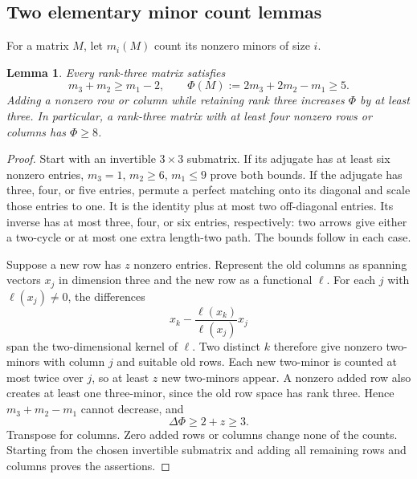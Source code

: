 \documentclass[11pt,a4paper]{article}
\newtheorem{lemma}[theorem]{Lemma}
\theoremstyle{remark}\newtheorem{remark}[theorem]{Remark}
\begin{document}
\subsection{Two elementary minor count lemmas}
For a matrix $M$, let $m_i(M)$ count its nonzero minors of size $i$.

\begin{lemma}\label{mrn:e:r8:lem:minor}
Every rank-three matrix satisfies
\[
 m_3+m_2\ge m_1-2,\qquad
 \Phi(M):=2m_3+2m_2-m_1\ge5.
\]
Adding a nonzero row or column while retaining rank three increases $\Phi$ by at least three. In particular, a rank-three matrix with at least four nonzero rows or columns has $\Phi\ge8$.
\end{lemma}
\begin{proof}
Start with an invertible $3\times3$ submatrix. If its adjugate has at least six nonzero entries, $m_3=1$, $m_2\ge6$, $m_1\le9$ prove both bounds. If the adjugate has three, four, or five entries, permute a perfect matching onto its diagonal and scale those entries to one. It is the identity plus at most two off-diagonal entries. Its inverse has at most three, four, or six entries, respectively: two arrows give either a two-cycle or at most one extra length-two path. The bounds follow in each case.

Suppose a new row has $z$ nonzero entries. Represent the old columns as spanning vectors $x_j$ in dimension three and the new row as a functional $\ell$. For each $j$ with $\ell(x_j)\ne0$, the differences
\[
 x_k-\frac{\ell(x_k)}{\ell(x_j)}x_j
\]
span the two-dimensional kernel of $\ell$. Two distinct $k$ therefore give nonzero two-minors with column $j$ and suitable old rows. Each new two-minor is counted at most twice over $j$, so at least $z$ new two-minors appear. A nonzero added row also creates at least one three-minor, since the old row space has rank three. Hence $m_3+m_2-m_1$ cannot decrease, and
\[
 \Delta\Phi\ge2+z\ge3.
\]
Transpose for columns. Zero added rows or columns change none of the counts. Starting from the chosen invertible submatrix and adding all remaining rows and columns proves the assertions.
\end{proof}
\end{document}

